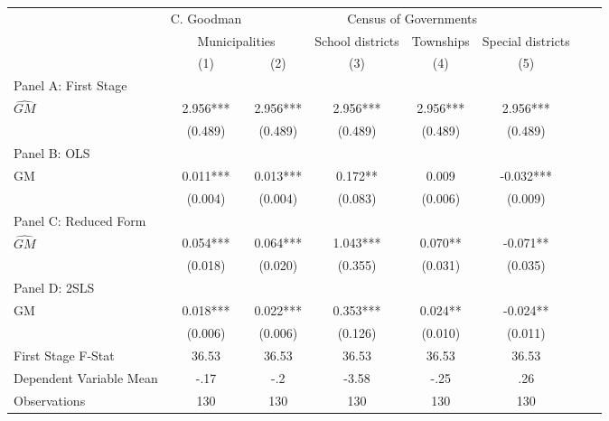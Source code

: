  \begin{tabular}{l*{7}{c}} \toprule
&\multicolumn{1}{c}{C. Goodman}&\multicolumn{4}{c}{Census of Governments}\\\cmidrule(lr){2-2}\cmidrule(lr){3-6}
&\multicolumn{2}{c}{Municipalities}&\multicolumn{1}{c}{School districts}&\multicolumn{1}{c}{Townships}&\multicolumn{1}{c}{Special districts}\\\cmidrule(lr){2-3}\cmidrule(lr){4-6}
&\multicolumn{1}{c}{(1)}&\multicolumn{1}{c}{(2)}&\multicolumn{1}{c}{(3)}&\multicolumn{1}{c}{(4)}&\multicolumn{1}{c}{(5)}\\
\cmidrule(lr){1-6}
\multicolumn{5}{l}{Panel A: First Stage}\\
\cmidrule(lr){1-6}
$\widehat{GM}$  &    2.956***&    2.956***&    2.956***&    2.956***&    2.956***\\
                &  (0.489)   &  (0.489)   &  (0.489)   &  (0.489)   &  (0.489)   \\
\cmidrule(lr){1-6}
\multicolumn{5}{l}{Panel B: OLS}\\
\cmidrule(lr){1-6}
GM              &    0.011***&    0.013***&    0.172** &    0.009   &   -0.032***\\
                &  (0.004)   &  (0.004)   &  (0.083)   &  (0.006)   &  (0.009)   \\
\cmidrule(lr){1-6}
\multicolumn{5}{l}{Panel C: Reduced Form}\\
\cmidrule(lr){1-6}
$\widehat{GM}$  &    0.054***&    0.064***&    1.043***&    0.070** &   -0.071** \\
                &  (0.018)   &  (0.020)   &  (0.355)   &  (0.031)   &  (0.035)   \\
\cmidrule(lr){1-6}
\multicolumn{5}{l}{Panel D: 2SLS}\\
\cmidrule(lr){1-6}
GM              &    0.018***&    0.022***&    0.353***&    0.024** &   -0.024** \\
                &  (0.006)   &  (0.006)   &  (0.126)   &  (0.010)   &  (0.011)   \\
\midrule
First Stage F-Stat&    36.53   &    36.53   &    36.53   &    36.53   &    36.53   \\
Dependent Variable Mean&     -.17   &      -.2   &    -3.58   &     -.25   &      .26   \\
Observations    &      130   &      130   &      130   &      130   &      130   \\
       \bottomrule \end{tabular}
